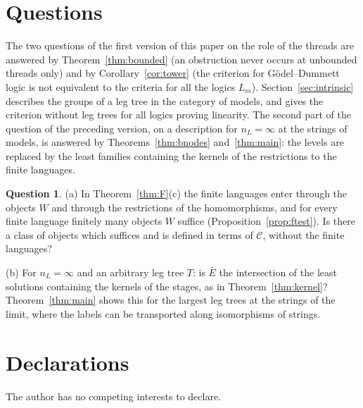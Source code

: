 \documentclass[11pt]{amsart}
\theoremstyle{definition}
\newtheorem{que}[thm]{Question}
\newcommand{\cC}{\mathcal C}
\begin{document}
\section{Questions}\label{sec:questions}

The two questions of the first version of this paper on the role of
the threads are answered by Theorem~\ref{thm:bounded} (an obstruction
never occurs at unbounded threads only) and by
Corollary~\ref{cor:tower} (the criterion for G\"odel--Dummett logic is
not equivalent to the criteria for all the logics $L_m$).
Section~\ref{sec:intrinsic} describes the groups of a leg tree in the
category of models, and gives the criterion without leg trees for all
logics proving linearity. The second part of the question of the
preceding version, on a description for $n_L=\infty$ at the strings
of models, is answered by Theorems~\ref{thm:bnodes}
and~\ref{thm:main}: the levels are replaced by the least families
containing the kernels of the restrictions to the finite languages.

\begin{que}
(a) In Theorem~\ref{thm:F}(c) the finite languages enter through the
objects $W$ and through the restrictions of the homomorphisms, and
for every finite language finitely many objects $W$ suffice
(Proposition~\ref{prop:ftest}). Is there a class of objects which
suffices and is defined in terms of $\cC$, without the finite
languages?

(b) For $n_L=\infty$ and an arbitrary leg tree $T$: is $\bar E$ the
intersection of the least solutions containing the kernels of the
stages, as in Theorem~\ref{thm:kernel}? Theorem~\ref{thm:main} shows
this for the largest leg trees at the strings of the limit, where the
labels can be transported along isomorphisms of strings.
\end{que}

\section*{Declarations}
The author has no competing interests to declare.
\end{document}
